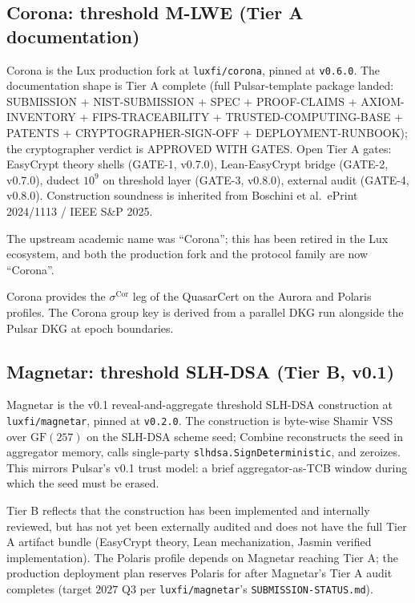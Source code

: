 \subsection{Corona: threshold M-LWE (Tier A documentation)}

Corona \cite{corona,ringtail} is the Lux production
fork at \texttt{luxfi/corona}, pinned at \texttt{v0.6.0}. The
documentation shape is Tier A complete (full Pulsar-template package
landed: SUBMISSION + NIST-SUBMISSION + SPEC + PROOF-CLAIMS +
AXIOM-INVENTORY + FIPS-TRACEABILITY + TRUSTED-COMPUTING-BASE + PATENTS
+ CRYPTOGRAPHER-SIGN-OFF + DEPLOYMENT-RUNBOOK); the cryptographer
verdict is APPROVED WITH GATES. Open Tier A gates: EasyCrypt theory
shells (GATE-1, v0.7.0), Lean-EasyCrypt bridge (GATE-2, v0.7.0),
dudect $10^9$ on threshold layer (GATE-3, v0.8.0), external audit
(GATE-4, v0.8.0). Construction soundness is inherited from Boschini
et al.~ePrint 2024/1113 / IEEE S\&P 2025.

The upstream academic name was ``Corona''; this has been retired
in the Lux ecosystem, and both the production fork and the
protocol family are now ``Corona''.

Corona provides the $\sigma^{\mathrm{Cor}}$ leg of the QuasarCert
on the Aurora and Polaris profiles. The Corona group key is derived
from a parallel DKG run alongside the Pulsar DKG at epoch boundaries.

\subsection{Magnetar: threshold SLH-DSA (Tier B, v0.1)}

Magnetar \cite{magnetar} is the v0.1 reveal-and-aggregate
threshold SLH-DSA construction at \texttt{luxfi/magnetar}, pinned
at \texttt{v0.2.0}. The construction is byte-wise Shamir VSS over
$\mathrm{GF}(257)$ on the SLH-DSA scheme seed; Combine reconstructs
the seed in aggregator memory, calls single-party
\texttt{slhdsa.SignDeterministic}, and zeroizes. This mirrors
Pulsar's v0.1 trust model: a brief aggregator-as-TCB window during
which the seed must be erased.

Tier B reflects that the construction has been implemented and
internally reviewed, but has not yet been externally audited and
does not have the full Tier A artifact bundle (EasyCrypt theory,
Lean mechanization, Jasmin verified implementation). The Polaris
profile depends on Magnetar reaching Tier A; the production
deployment plan reserves Polaris for after Magnetar's Tier A
audit completes (target $2027$ Q3 per \texttt{luxfi/magnetar}'s
\texttt{SUBMISSION-STATUS.md}).

